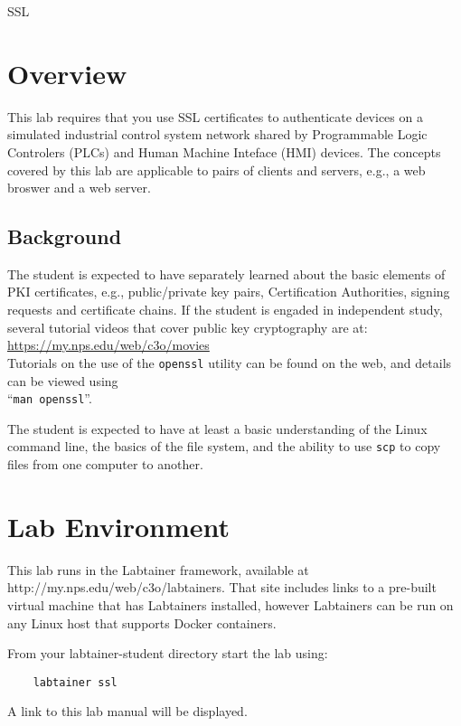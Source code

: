 


\begin{center}
{\LARGE SSL}
\vspace{0.1in}\\
\end{center}

\copyrightnotice

\section{Overview}
This lab requires that you use SSL certificates to authenticate devices
on a simulated industrial control system network shared by 
Programmable Logic Controlers (PLCs) and Human Machine Inteface (HMI) devices.
The concepts covered by this lab are applicable to pairs of clients and servers,
e.g., a web broswer and a web server.

\subsection {Background}
The student is expected to have separately learned about the basic elements of PKI 
certificates, e.g., public/private key pairs, Certification Authorities, 
signing requests and certificate chains.  If the student is engaded in independent
study, several tutorial videos that cover public key cryptography are at:\\
\url{https://my.nps.edu/web/c3o/movies} \\
Tutorials on the use of the {\tt openssl} utility can be found on the web, and details
can be viewed using \\
``{\tt man openssl}''.

The student is expected to have at least a basic understanding of the Linux command line,
the basics of the file system, and the ability to use {\tt scp} to copy files from
one computer to another.

\section{Lab Environment}
This lab runs in the Labtainer framework,
available at http://my.nps.edu/web/c3o/labtainers.
That site includes links to a pre-built virtual machine
that has Labtainers installed, however Labtainers can
be run on any Linux host that supports Docker containers.

From your labtainer-student directory start the lab using:
\begin{verbatim}
    labtainer ssl
\end{verbatim}
\noindent A link to this lab manual will be displayed.  

